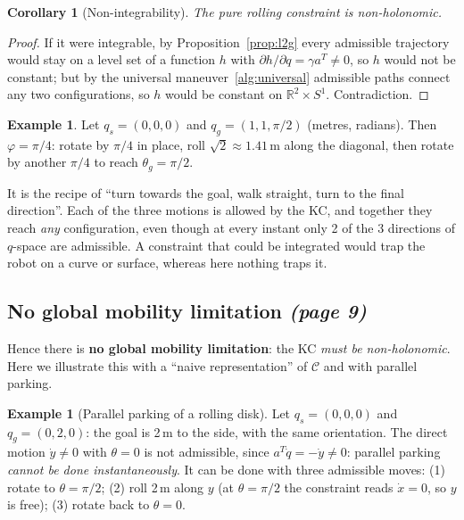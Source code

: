 \documentclass[11pt,a4paper]{article}
\theoremstyle{definition}
\newtheorem{example}[definition]{Example}
\theoremstyle{plain}
\newtheorem{corollary}[definition]{Corollary}
\begin{document}
\begin{corollary}[Non-integrability]
The pure rolling constraint is non-holonomic.
\end{corollary}
\begin{proof}
If it were integrable, by Proposition~\ref{prop:l2g} every admissible trajectory would stay on a level set of a function $h$ with $\partial h/\partial q=\gamma a^{T}\neq0$, so $h$ would not be constant; but by the universal maneuver~\ref{alg:universal} admissible paths connect any two configurations, so $h$ would be constant on $\mathbb R^2\times S^1$. Contradiction.
\end{proof}
 
\begin{example}
Let $q_s=(0,0,0)$ and $q_g=(1,1,\pi/2)$ (metres, radians). Then $\varphi=\pi/4$: rotate by $\pi/4$ in place, roll $\sqrt2\approx1.41$\,m along the diagonal, then rotate by another $\pi/4$ to reach $\theta_g=\pi/2$.
\end{example}
 
\begin{intuition}
It is the recipe of ``turn towards the goal, walk straight, turn to the final direction''. Each of the three motions is allowed by the KC, and together they reach \emph{any} configuration, even though at every instant only 2 of the 3 directions of $q$-space are admissible. A constraint that could be integrated would trap the robot on a curve or surface, whereas here nothing traps it.
\end{intuition}
 
\subsection{No global mobility limitation \emph{(page 9)}}
 
Hence there is \textbf{no global mobility limitation}: the KC \emph{must be non-holonomic}. Here we illustrate this with a ``naive representation'' of $\mathcal C$ and with parallel parking.
 
\begin{example}[Parallel parking of a rolling disk]
Let $q_s=(0,0,0)$ and $q_g=(0,2,0)$: the goal is 2\,m to the side, with the same orientation. The direct motion $\dot y\neq0$ with $\theta=0$ is not admissible, since $a^{T}\dot q=-\dot y\neq0$: parallel parking \emph{cannot be done instantaneously}. It can be done with three admissible moves: (1) rotate to $\theta=\pi/2$; (2) roll 2\,m along $y$ (at $\theta=\pi/2$ the constraint reads $\dot x=0$, so $y$ is free); (3) rotate back to $\theta=0$.
\end{example}
 
\end{document}
